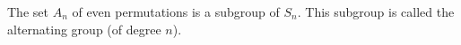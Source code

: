 The set $A_n$ of even permutations is a subgroup of $S_n$. This subgroup is called the alternating group (of degree $n$).
